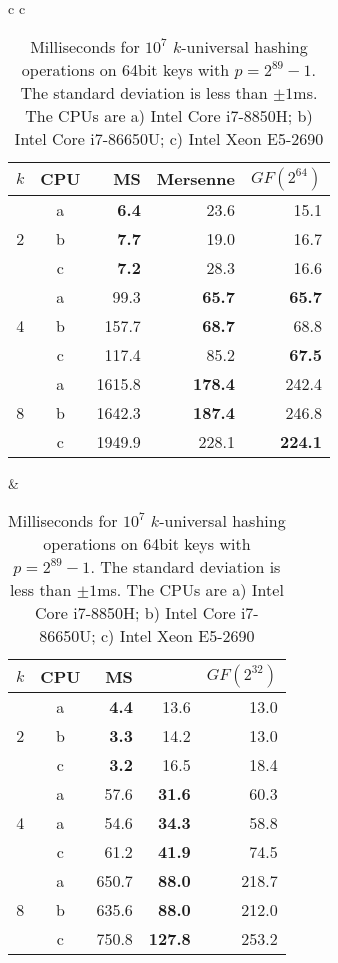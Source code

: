 \begin{table}[H]
   \centering
   \begin{tabular}{c c}
      \begin{tabular}{r c | r r r}
         $k$ & CPU &  MS & Mersenne       & $GF(2^{64})$ \\
         \hline
           & a & \textbf{6.4} & 23.6 & 15.1 \\
         2 & b & \textbf{7.7} & 19.0 & 16.7 \\
           & c & \textbf{7.2} & 28.3 & 16.6 \\
         \hline
           & a & 99.3 & \textbf{65.7} & \textbf{65.7} \\
         4 & b & 157.7 &\textbf{68.7}  & 68.8 \\
           & c & 117.4 & 85.2 & \textbf{67.5}\\
         \hline
             & a & 1615.8 & \textbf{178.4} & 242.4 \\
         8 & b &  1642.3 & \textbf{187.4} & 246.8 \\
           & c & 1949.9 & 228.1 & \textbf{224.1} \\
      \end{tabular}
      \hspace{.5em}
      &
      \hspace{.5em}
      \begin{tabular}{r c | r r r}
         $k$ & CPU & MS & \Cref{alg:Mersenne}       & $GF(2^{32})$ \\
         \hline
             & a & \textbf{4.4} & 13.6 & 13.0 \\
         2 & b & \textbf{3.3} & 14.2 & 13.0 \\
           & c & \textbf{3.2} & 16.5 & 18.4 \\
         \hline
           & a & 57.6 & \textbf{31.6} & 60.3 \\
         4 & a & 54.6 & \textbf{34.3}  & 58.8 \\
           & c & 61.2 & \textbf{41.9} & 74.5 \\
         \hline
           & a & 650.7 & \textbf{88.0} & 218.7 \\
         8 & b & 635.6   & \textbf{88.0} & 212.0 \\
           & c & 750.8 & \textbf{127.8} & 253.2 \\
      \end{tabular}
   \end{tabular}
   \caption{Milliseconds for $10^7$ $k$-universal hashing operations on 64bit keys with $p=2^{89}-1$.
      The standard deviation is less than $\pm1$ms.
      The CPUs are
         a) Intel Core i7-8850H; %
         b) Intel Core i7-86650U; %
         c) Intel Xeon E5-2690 %
   }
   \label{tab:hashing-experiments}
\end{table}

